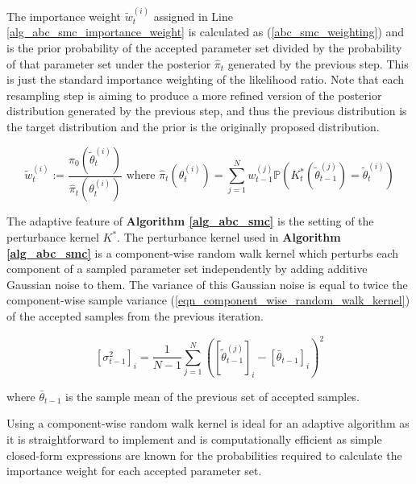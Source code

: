 \documentclass[11pt,a4paper]{article}
\newcommand*{\prob}{\mathbb{P}}
\theoremstyle{break}
\begin{document}
  \par The importance weight $\tilde{w}_t^{(i)}$ assigned in Line \ref{alg_abc_smc_importance_weight} is calculated as (\ref{abc_smc_weighting}) and is the prior probability of the accepted parameter set divided by the probability of that parameter set under the posterior $\hat\pi_t$ generated by the previous step. This is just the standard importance weighting of the likelihood ratio. Note that each resampling step is aiming to produce a more refined version of the posterior distribution generated by the previous step, and thus the previous distribution is the target distribution and the prior is the originally proposed distribution.

  \begin{equation}\label{abc_smc_weighting}
    \tilde{w}_t^{(i)}:=\frac{\pi_0\left(\tilde\theta_t^{(i)}\right)}{\hat\pi_t\left(\theta_t^{(i)}\right)}\text{ where }\hat\pi_t\left(\theta_t^{(i)}\right)=\sum_{j=1}^Nw_{t-1}^{(j)}\prob\left(K_t^*\left(\tilde\theta_{t-1}^{(j)}\right)=\tilde\theta_{t}^{(i)}\right)
  \end{equation}

  \par The adaptive feature of \textbf{Algorithm \ref{alg_abc_smc}} is the setting of the perturbance kernel $K^*$. The perturbance kernel used in \textbf{Algorithm \ref{alg_abc_smc}} is a component-wise random walk kernel which perturbs each component of a sampled parameter set independently by adding additive Gaussian noise to them. The variance of this Gaussian noise is equal to twice the component-wise sample variance (\ref{eqn_component_wise_random_walk_kernel}) of the accepted samples from the previous iteration.

  \begin{equation}\label{eqn_component_wise_random_walk_kernel}
    \left[\sigma_{t-1}^2\right]_i=\frac1{N-1}\sum_{j=1}^N\left(\left[\tilde\theta_{t-1}^{(j)}\right]_i-\left[\bar\theta_{t-1}\right]_i\right)^2
  \end{equation}

  where $\bar\theta_{t-1}$ is the sample mean of the previous set of accepted samples.

  \par Using a component-wise random walk kernel is ideal for an adaptive algorithm as it is straightforward to implement and is computationally efficient as simple closed-form expressions are known for the probabilities required to calculate the importance weight for each accepted parameter set.
\end{document}
